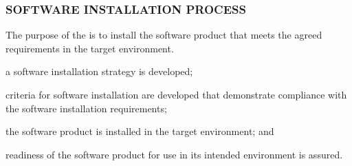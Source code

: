 		\newpage
		\subsubsection{SOFTWARE INSTALLATION PROCESS\label{proc:software_installation_process}}

			\begin{adjustwidth}{2em}{0pt} 

				The purpose of the  is to install the software product that meets the agreed requirements in the target environment.

			\end{adjustwidth}

			\begin{adjustwidth}{2em}{0pt} 

				\begin{compactitem}

					\item a software installation strategy is developed;

					\item criteria for software installation are developed that demonstrate compliance with the software installation requirements;

					\item the software product is installed in the target environment; and

					\item readiness of the software product for use in its intended environment is assured.

				\end{compactitem}

			\end{adjustwidth}


